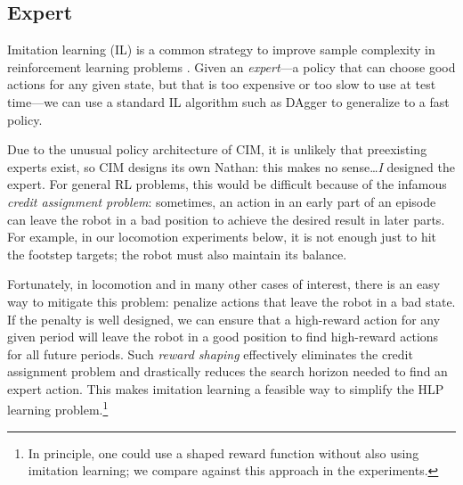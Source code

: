 \documentclass[conference]{IEEEtran}
\newcommand{\nhatch}[1]{{\leavevmode\color{magenta} Nathan: #1}}
\begin{document}
\subsection{Expert} \label{sec:expert}

Imitation learning (IL) is a common strategy to improve sample complexity in reinforcement learning problems \citep{osa2018algorithmic}.
Given an \emph{expert}---a policy that can choose good actions for any given state, but that is too expensive or too slow to use at test time---we can use
a standard IL algorithm such as DAgger \citep{ross2011reduction} to generalize to a fast policy.

Due to the unusual policy architecture of CIM, it is unlikely that preexisting experts exist,
so CIM designs its own \nhatch{this makes no sense\dots\emph{I} designed the expert}.
For general RL problems, this would be difficult because of the infamous \emph{credit assignment problem}:
sometimes, an action in an early part of an episode can leave the robot in a bad position to achieve the desired result in later parts.
For example, in our locomotion experiments below, it is not enough just to hit the footstep targets; the robot must also maintain its balance.

Fortunately, in locomotion and in many other cases of interest, there is an easy way to mitigate this problem: penalize actions that leave the robot in a bad state.
If the penalty is well designed, we can ensure that a high-reward action for any given period will leave the robot in a good position to find high-reward actions for all future periods.
Such \emph{reward shaping} effectively eliminates the credit assignment problem and drastically reduces the search horizon needed to find an expert action.
This makes imitation learning a feasible way to simplify the HLP learning problem.\footnote{
In principle, one could use a shaped reward function without also using imitation learning; we compare against this approach in the experiments.}
\end{document}
